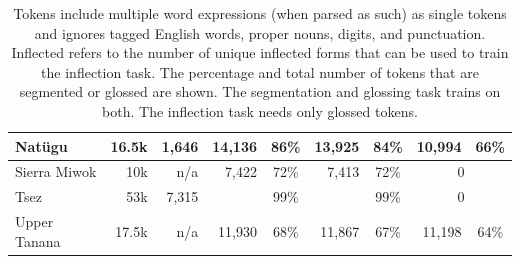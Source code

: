 \begin{table}
\begin{tabular}{l|r|r|rc|rc|rc}
         \hline
         Natügu & 16.5k & 1,646 & 14,136 & 86\%  & 13,925 &  84\% & 10,994 & 66\% \\
         \hline
         Sierra Miwok & 10k  & n/a & 7,422 & 72\% & 7,413 & 72\% & \multicolumn{2}{c}{0} \\
         \hline
         Tsez & 53k & 7,315 &  & 99\% &  & 99\% & \multicolumn{2}{c}{0}  \\
         \hline
         Upper Tanana & 17.5k & n/a & 11,930 & 68\% & 11,867 & 67\% & 11,198 & 64\% 
    \end{tabular}
    \caption[Data Statistics]{Tokens include multiple word expressions (when parsed as such) as single tokens and ignores tagged English words, proper nouns, digits, and punctuation. Inflected refers to the number of unique inflected forms that can be used to train the inflection task. The percentage and total number of tokens that are segmented or glossed are shown.  The segmentation and glossing task trains on both. The inflection task needs only glossed tokens.}
    \label{tab:dissdata}
\end{table}


